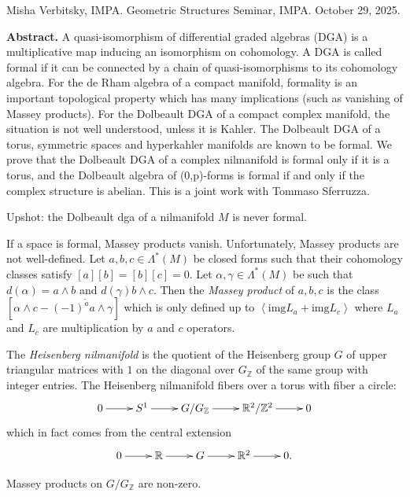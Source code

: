 \noindent
Misha Verbitsky, IMPA.
Geometric Structures Seminar, IMPA.
October 29, 2025.

\medskip\noindent
{\bf Abstract.}
A quasi-isomorphism of differential graded
algebras (DGA) is a multiplicative
map inducing an isomorphism on cohomology. A
DGA is called  formal if it can be
connected by a chain of  quasi-isomorphisms
to its cohomology algebra. For the
de Rham algebra of a compact manifold,
formality is an important  topological
property which has many implications (such as
vanishing of Massey products). For
the Dolbeault DGA of a compact complex
manifold, the situation is not well
understood, unless it is Kahler. The
Dolbeault DGA of a torus, symmetric spaces
and hyperkahler manifolds are known to be
formal.  We prove that the Dolbeault
DGA of a complex nilmanifold is formal only
if it is a torus, and the Dolbeault
algebra of (0,p)-forms is formal if and only
if the complex structure is
abelian. This is a joint work with Tommaso
Sferruzza.

\medskip\noindent
Upshot: the Dolbeault dga of a nilmanifold
$M$ is never formal.

\medskip\noindent
If a space is formal, Massey products vanish.
Unfortunately, Massey products are not
well-defined.
Let $a,b,c \in \Lambda^*(M)$ be closed forms
such that their cohomology classes satisfy
$[a][b]=[b][c]=0$.
Let  $\alpha,\gamma \in \Lambda^*(M)$
be such that $d(\alpha)=a \wedge b$ and
$d(\gamma)b \wedge c$.
Then the {\it Massey product} of $a,b,c$
is the class  $[\alpha \wedge
c-(-1)^{\tilde{a}}a \wedge \gamma]$
which is only defined up to
 $\left\langle{}\text{img}L_a + \text{img}
 L_c\right\rangle{}$
where $L_a$ and $L_c$ are multiplication by
$a$ and $c$ operators.

The {\it Heisenberg nilmanifold} is the
quotient of
the Heisenberg group $G$ of upper triangular
matrices
with $1$ on the diagonal over
$G_{\mathbb{Z}}$
of the same group with integer entries.
The Heisenberg nilmanifold fibers over a
torus
with fiber a circle:
$$
\xymatrix{
0\ar[r]&S^1\ar[r]&G/G_{\mathbb{Z}}\ar[r]&
\mathbb{R}^2/\mathbb{Z}^2\ar[r]&0
}
$$
which in fact comes from the central
extension
$$
\xymatrix{
0\ar[r]&\mathbb{R}\ar[r]&G\ar[r]&\mathbb{R}
^2\ar[r]&0.
}
$$


\begin{lemma}
\label{lemma-heise-nilma-masse-produ}
Massey products on  $G/G_{\mathbb{Z}}$ are
non-zero.
\end{lemma}

